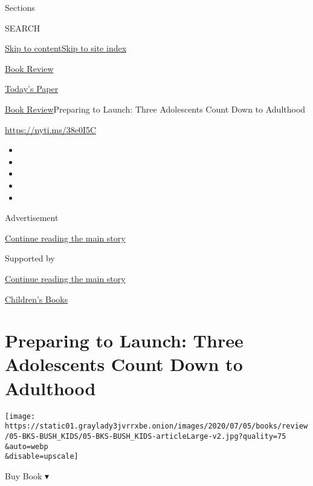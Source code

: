 Sections

SEARCH

\protect\hyperlink{site-content}{Skip to
content}\protect\hyperlink{site-index}{Skip to site index}

\href{https://www.nytimes3xbfgragh.onion/section/books/review}{Book
Review}

\href{https://myaccount.nytimes3xbfgragh.onion/auth/login?response_type=cookie\&client_id=vi}{}

\href{https://www.nytimes3xbfgragh.onion/section/todayspaper}{Today's
Paper}

\href{/section/books/review}{Book Review}\textbar{}Preparing to Launch:
Three Adolescents Count Down to Adulthood

\url{https://nyti.ms/38e0I5C}

\begin{itemize}
\item
\item
\item
\item
\item
\end{itemize}

Advertisement

\protect\hyperlink{after-top}{Continue reading the main story}

Supported by

\protect\hyperlink{after-sponsor}{Continue reading the main story}

\href{/column/childrens-books}{Children's Books}

\hypertarget{preparing-to-launch-three-adolescents-count-down-to-adulthood}{%
\section{Preparing to Launch: Three Adolescents Count Down to
Adulthood}\label{preparing-to-launch-three-adolescents-count-down-to-adulthood}}

\texttt{[image: https://static01.graylady3jvrrxbe.onion/images/2020/07/05/books/review/05-BKS-BUSH\_KIDS/05-BKS-BUSH\_KIDS-articleLarge-v2.jpg?quality=75\\\&auto=webp\\\&disable=upscale]}

Buy Book ▾

